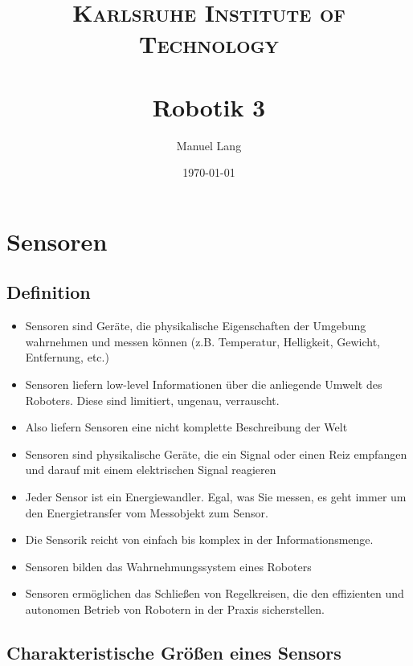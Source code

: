 \documentclass[paper=a4, fontsize=11pt]{scrartcl} %
\title{	
\normalfont \normalsize 
\textsc{Karlsruhe Institute of Technology} \\ [25pt] %
\horrule{0.5pt} \\[0.4cm] %
\huge Robotik 3 %
\horrule{2pt} \\[0.5cm] %
}
\author{Manuel Lang} %
\date{\normalsize\today} %
\numberwithin{equation}{section} %
\numberwithin{figure}{section} %
\numberwithin{table}{section} %
\begin{document}
\tableofcontents
\newpage

\section{Sensoren}

\subsection{Definition}

\begin{itemize}
\item Sensoren sind Geräte, die physikalische Eigenschaften der Umgebung wahrnehmen und messen können (z.B. Temperatur, Helligkeit, Gewicht, Entfernung, etc.)
\item Sensoren liefern low-level Informationen über die anliegende Umwelt des Roboters. Diese sind limitiert, ungenau, verrauscht.
\item Also liefern Sensoren eine nicht komplette Beschreibung der Welt
\item Sensoren sind physikalische Geräte, die ein Signal oder einen Reiz empfangen und darauf mit einem elektrischen Signal reagieren
\item Jeder Sensor ist ein Energiewandler. Egal, was Sie messen, es geht immer um den Energietransfer vom Messobjekt zum Sensor.
\item Die Sensorik reicht von einfach bis komplex in der Informationsmenge.
\item Sensoren bilden das Wahrnehmungssystem eines Roboters
\item Sensoren ermöglichen das Schließen von Regelkreisen, die den effizienten und autonomen Betrieb von Robotern in der Praxis sicherstellen.
\end{itemize}

\subsection{Charakteristische Größen eines Sensors}
\end{document}
